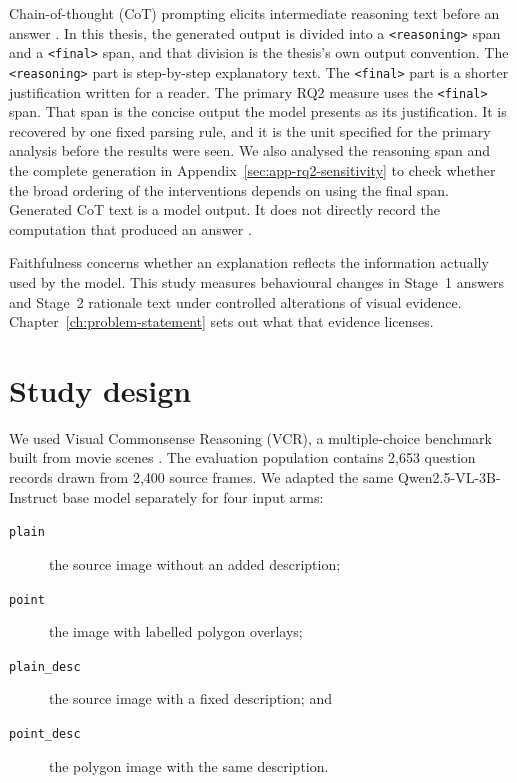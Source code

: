 Chain-of-thought (CoT) prompting elicits intermediate reasoning text before an
answer \citep{WeiEtAl22CoT}. In this thesis, the generated output is divided
into a \texttt{<reasoning>} span and a \texttt{<final>} span, and that division
is the thesis's own output convention. The
\texttt{<reasoning>} part is step-by-step explanatory text. The
\texttt{<final>} part is a shorter justification written for a reader. The
primary RQ2 measure uses the \texttt{<final>} span. That span is the concise
output the model presents as its justification. It is recovered by one fixed parsing rule, and it is the unit
specified for the primary analysis before the results were seen. We also
analysed the reasoning span and the complete generation in
Appendix~\ref{sec:app-rq2-sensitivity} to check whether the broad ordering of
the interventions depends on using the final span. Generated CoT text is a model
output. It does not directly record the computation that produced an answer
\citep{DBLP:journals/corr/abs-2307-13702}.

Faithfulness concerns whether an explanation reflects the information actually
used by the model. This study measures behavioural changes in Stage~1 answers
and Stage~2 rationale text under controlled alterations of visual evidence.
Chapter~\ref{ch:problem-statement} sets out what that evidence licenses.

\section{Study design}
\label{sec:intro-design}

We used Visual Commonsense Reasoning (VCR), a multiple-choice benchmark built
from movie scenes \citep{DBLP:conf/cvpr/ZellersBFC19}. The evaluation population
contains 2,653 question records drawn from 2,400 source frames. We adapted the
same Qwen2.5-VL-3B-Instruct base model separately for four input arms:

\begin{description}
\item[\texttt{plain}] the source image without an added description;
\item[\texttt{point}] the image with labelled polygon overlays;
\item[\texttt{plain\_desc}] the source image with a fixed description; and
\item[\texttt{point\_desc}] the polygon image with the same description.
\end{description}

